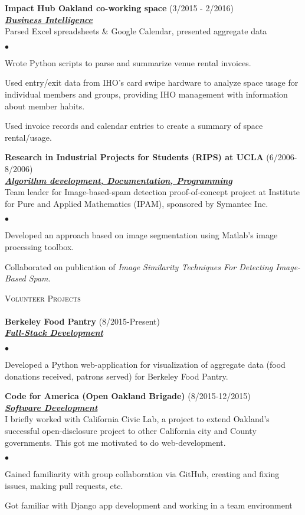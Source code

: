 \documentclass{article}
\newcommand{\lineunder}{\vspace*{-8pt} \\ \hspace*{-18pt} \hrulefill \\}
\newcommand{\header}[1]{{\hspace*{-15pt}\vspace*{6pt} \textsc{#1}} \vspace*{-6pt} \lineunder}
\newcommand{\employer}[3]{{ \textbf{#1} (#2)\\ \underline{\textbf{\emph{#3}}}\\  }}
\newenvironment{achievements}{\begin{list}{$\bullet$}{\topsep 0pt \itemsep -2pt}}{\vspace*{4pt}\end{list}}
\begin{document}
\employer{Impact Hub Oakland co-working space}{3/2015 - 2/2016}{Business Intelligence}
Parsed Excel spreadsheets \& Google Calendar, presented aggregate data
\begin{achievements}
\item Wrote Python scripts to parse and summarize venue rental invoices.
\item Used entry/exit data from IHO's card swipe hardware to analyze space usage for individual members and groups, providing IHO management with information about member habits.
\item Used invoice records and calendar entries to create a summary of space rental/usage.
\end{achievements}



\employer{Research in Industrial Projects for Students (RIPS) at UCLA}{6/2006-8/2006}{Algorithm development, Documentation, Programming}
Team leader for Image-based-spam detection proof-of-concept project at  Institute for Pure and Applied Mathematics (IPAM), sponsored by Symantec Inc.
	\begin{achievements}
	\item Developed an approach based on image segmentation using Matlab's image processing toolbox.
	\item Collaborated on publication of \emph{Image Similarity Techniques For Detecting Image-Based Spam}.
\end{achievements}

\header{Volunteer Projects}
\employer{Berkeley Food Pantry}{8/2015-Present}{Full-Stack Development}
\begin{achievements}
\item Developed a Python web-application for visualization of aggregate data (food donations received, patrons served) for Berkeley Food Pantry. 
\end{achievements}

\employer{Code for America (Open Oakland Brigade)}{8/2015-12/2015}{Software Development}
I briefly worked with California Civic Lab, a project to extend Oakland's successful open-disclosure project to other California city and County governments.  This got me motivated to do web-development.
\begin{achievements}
\item Gained familiarity with group collaboration via GitHub, creating and fixing issues, making pull requests, etc.
\item Got familiar with Django app development and working in a team environment
\end{achievements}
\end{document}
